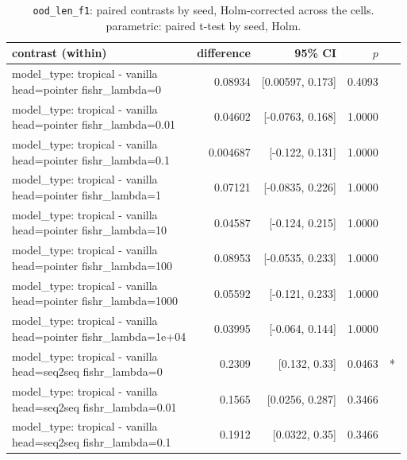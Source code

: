 \documentclass[10pt]{article}
\makeatletter
\newcommand{\stackcell}[1]{\begin{tabular}[t]{@{}l@{}}#1\end{tabular}}
\makeatother
\begin{document}
{\small
\begin{longtable}{lrrrl}
\caption{\texttt{ood\_len\_f1}: paired contrasts by seed, Holm-corrected across the cells. parametric: paired t-test by seed, Holm.}\label{tab:paired-ood_len_f1}\\
\toprule
contrast (within) & difference & 95\% CI & $p$ & \\
\midrule
\endhead
\stackcell{model\_type: tropical - vanilla\\\footnotesize head=pointer fishr\_lambda=0 } & 0.08934 & [0.00597, 0.173] & 0.4093 & \\
\stackcell{model\_type: tropical - vanilla\\\footnotesize head=pointer fishr\_lambda=0.01 } & 0.04602 & [-0.0763, 0.168] & 1.0000 & \\
\stackcell{model\_type: tropical - vanilla\\\footnotesize head=pointer fishr\_lambda=0.1 } & 0.004687 & [-0.122, 0.131] & 1.0000 & \\
\stackcell{model\_type: tropical - vanilla\\\footnotesize head=pointer fishr\_lambda=1 } & 0.07121 & [-0.0835, 0.226] & 1.0000 & \\
\stackcell{model\_type: tropical - vanilla\\\footnotesize head=pointer fishr\_lambda=10 } & 0.04587 & [-0.124, 0.215] & 1.0000 & \\
\stackcell{model\_type: tropical - vanilla\\\footnotesize head=pointer fishr\_lambda=100 } & 0.08953 & [-0.0535, 0.233] & 1.0000 & \\
\stackcell{model\_type: tropical - vanilla\\\footnotesize head=pointer fishr\_lambda=1000 } & 0.05592 & [-0.121, 0.233] & 1.0000 & \\
\stackcell{model\_type: tropical - vanilla\\\footnotesize head=pointer fishr\_lambda=1e+04 } & 0.03995 & [-0.064, 0.144] & 1.0000 & \\
\stackcell{model\_type: tropical - vanilla\\\footnotesize head=seq2seq fishr\_lambda=0 } & 0.2309 & [0.132, 0.33] & 0.0463 & *\\
\stackcell{model\_type: tropical - vanilla\\\footnotesize head=seq2seq fishr\_lambda=0.01 } & 0.1565 & [0.0256, 0.287] & 0.3466 & \\
\stackcell{model\_type: tropical - vanilla\\\footnotesize head=seq2seq fishr\_lambda=0.1 } & 0.1912 & [0.0322, 0.35] & 0.3466 & \\

\end{longtable}}
\end{document}
